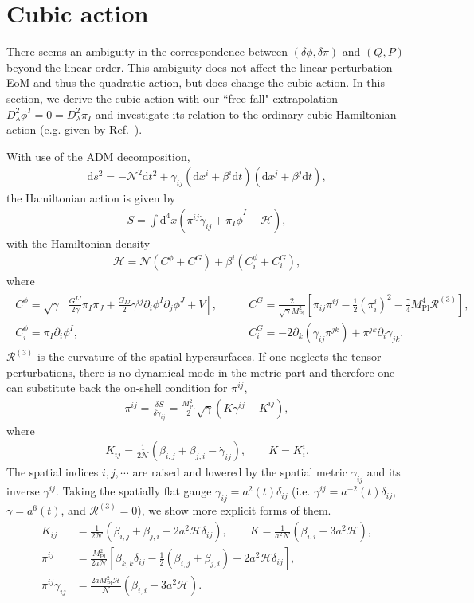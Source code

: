 \documentclass[aps, prd
, preprint
, nofootinbib 
, longbibliography
]{revtex4-1}
\newcommand{\var}[2]{\frac{\delta #1}{\delta #2}}
\newcommand{\dd}{\mathrm{d}}
\newcommand{\Mpl}{M_\mathrm{Pl}}
\newcommand{\dps}{\displaystyle}
\newcommand{\calH}{\mathcal{H}}
\newcommand{\scrH}{\mathscr{H}}
\newcommand{\calN}{\mathcal{N}}
\newcommand{\calR}{\mathcal{R}}
\newcommand{\dphi}{\delta\phi}
\newcommand{\dpi}{\delta\pi}
\newcommand{\bae}[1]{\begin{align} #1 \end{align}}
\begin{document}
\section{Cubic action}

There seems an ambiguity in the correspondence between $(\dphi,\dpi)$ and $(Q,P)$ beyond the linear order.
This ambiguity does not affect the linear perturbation EoM and thus the quadratic action, but does change the cubic action.
In this section, we derive the cubic action with our ``free fall" extrapolation $D_\lambda^2\phi^I=0=D_\lambda^2\pi_I$ and investigate its relation to the ordinary cubic Hamiltonian action (e.g. given by Ref.~\cite{Butchers:2018hds}).

With use of the ADM decomposition,
\bae{
    \dd s^2=-\calN^2\dd t^2+\gamma_{ij}(\dd x^i+\beta^i\dd t)(\dd x^j+\beta^j\dd t),
}
the Hamiltonian action is given by
\bae{
    S=\int\dd^4x(\pi^{ij}\dot{\gamma}_{ij}+\pi_I\dot{\phi}^I-\scrH),
}
with the Hamiltonian density
\bae{
    \scrH=\calN(C^\phi+C^G)+\beta^i(C_i^\phi+C_i^G),
}
where
\bae{
    \begin{array}{ll}
        \dps
        C^\phi=\sqrt{\gamma}\left[\frac{G^{IJ}}{2\gamma}\pi_I\pi_J+\frac{G_{IJ}}{2}\gamma^{ij}\partial_i\phi^I\partial_j\phi^J+V\right], & 
        \dps\qquad
        C^G=\frac{2}{\sqrt{\gamma}\Mpl^2}\left[\pi_{ij}\pi^{ij}-\frac{1}{2}\left(\pi^i_i\right)^2-\frac{\gamma}{4}\Mpl^4\calR^{(3)}\right], \\
        C^\phi_i=\pi_I\partial_i\phi^I, &
        \dps\qquad
        C^G_i=-2\partial_k(\gamma_{ij}\pi^{jk})+\pi^{jk}\partial_i\gamma_{jk}.
    \end{array}
}
$\calR^{(3)}$ is the curvature of the spatial hypersurfaces.
If one neglects the tensor perturbations, there is no dynamical mode in the metric part and therefore one can substitute back the on-shell condition for $\pi^{ij}$,
\bae{
    \pi^{ij}=\var{S}{\dot{\gamma}_{ij}}=\frac{\Mpl^2}{2}\sqrt{\gamma}(K\gamma^{ij}-K^{ij}),
}
where
\bae{
    K_{ij}=\frac{1}{2\calN}(\beta_{i,j}+\beta_{j,i}-\dot{\gamma}_{ij}), \qquad K=K^i_i.
}
The spatial indices $i,j,\cdots$ are raised and lowered by the spatial metric $\gamma_{ij}$ and its inverse $\gamma^{ij}$.
Taking the spatially flat gauge $\gamma_{ij}=a^2(t)\delta_{ij}$ (i.e. $\gamma^{ij}=a^{-2}(t)\delta_{ij}$, $\gamma=a^6(t)$, and $\calR^{(3)}=0$), we show more explicit forms of them.
\bae{
    K_{ij}&=\frac{1}{2\calN}(\beta_{i,j}+\beta_{j,i}-2a^2\calH\delta_{ij}), \qquad K=\frac{1}{a^2\calN}(\beta_{i,i}-3a^2\calH), \\
    \pi^{ij}&=\frac{\Mpl^2}{2a\calN}\left[\beta_{k,k}\delta_{ij}-\frac{1}{2}(\beta_{i,j}+\beta_{j,i})-2a^2\calH\delta_{ij}\right], \\
    \pi^{ij}\dot{\gamma}_{ij}&=\frac{2a\Mpl^2\calH}{\calN}(\beta_{i,i}-3a^2\calH).
}
\end{document}
